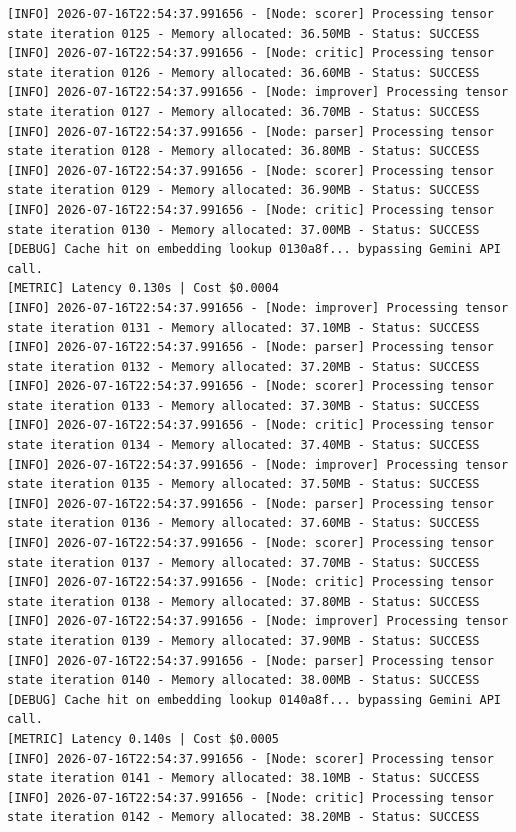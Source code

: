 \documentclass[10pt,journal,compsoc]{IEEEtran}
\begin{document}
\begin{verbatim}
[INFO] 2026-07-16T22:54:37.991656 - [Node: scorer] Processing tensor state iteration 0125 - Memory allocated: 36.50MB - Status: SUCCESS
[INFO] 2026-07-16T22:54:37.991656 - [Node: critic] Processing tensor state iteration 0126 - Memory allocated: 36.60MB - Status: SUCCESS
[INFO] 2026-07-16T22:54:37.991656 - [Node: improver] Processing tensor state iteration 0127 - Memory allocated: 36.70MB - Status: SUCCESS
[INFO] 2026-07-16T22:54:37.991656 - [Node: parser] Processing tensor state iteration 0128 - Memory allocated: 36.80MB - Status: SUCCESS
[INFO] 2026-07-16T22:54:37.991656 - [Node: scorer] Processing tensor state iteration 0129 - Memory allocated: 36.90MB - Status: SUCCESS
[INFO] 2026-07-16T22:54:37.991656 - [Node: critic] Processing tensor state iteration 0130 - Memory allocated: 37.00MB - Status: SUCCESS
[DEBUG] Cache hit on embedding lookup 0130a8f... bypassing Gemini API call.
[METRIC] Latency 0.130s | Cost $0.0004
[INFO] 2026-07-16T22:54:37.991656 - [Node: improver] Processing tensor state iteration 0131 - Memory allocated: 37.10MB - Status: SUCCESS
[INFO] 2026-07-16T22:54:37.991656 - [Node: parser] Processing tensor state iteration 0132 - Memory allocated: 37.20MB - Status: SUCCESS
[INFO] 2026-07-16T22:54:37.991656 - [Node: scorer] Processing tensor state iteration 0133 - Memory allocated: 37.30MB - Status: SUCCESS
[INFO] 2026-07-16T22:54:37.991656 - [Node: critic] Processing tensor state iteration 0134 - Memory allocated: 37.40MB - Status: SUCCESS
[INFO] 2026-07-16T22:54:37.991656 - [Node: improver] Processing tensor state iteration 0135 - Memory allocated: 37.50MB - Status: SUCCESS
[INFO] 2026-07-16T22:54:37.991656 - [Node: parser] Processing tensor state iteration 0136 - Memory allocated: 37.60MB - Status: SUCCESS
[INFO] 2026-07-16T22:54:37.991656 - [Node: scorer] Processing tensor state iteration 0137 - Memory allocated: 37.70MB - Status: SUCCESS
[INFO] 2026-07-16T22:54:37.991656 - [Node: critic] Processing tensor state iteration 0138 - Memory allocated: 37.80MB - Status: SUCCESS
[INFO] 2026-07-16T22:54:37.991656 - [Node: improver] Processing tensor state iteration 0139 - Memory allocated: 37.90MB - Status: SUCCESS
[INFO] 2026-07-16T22:54:37.991656 - [Node: parser] Processing tensor state iteration 0140 - Memory allocated: 38.00MB - Status: SUCCESS
[DEBUG] Cache hit on embedding lookup 0140a8f... bypassing Gemini API call.
[METRIC] Latency 0.140s | Cost $0.0005
[INFO] 2026-07-16T22:54:37.991656 - [Node: scorer] Processing tensor state iteration 0141 - Memory allocated: 38.10MB - Status: SUCCESS
[INFO] 2026-07-16T22:54:37.991656 - [Node: critic] Processing tensor state iteration 0142 - Memory allocated: 38.20MB - Status: SUCCESS

\end{verbatim}
\end{document}
